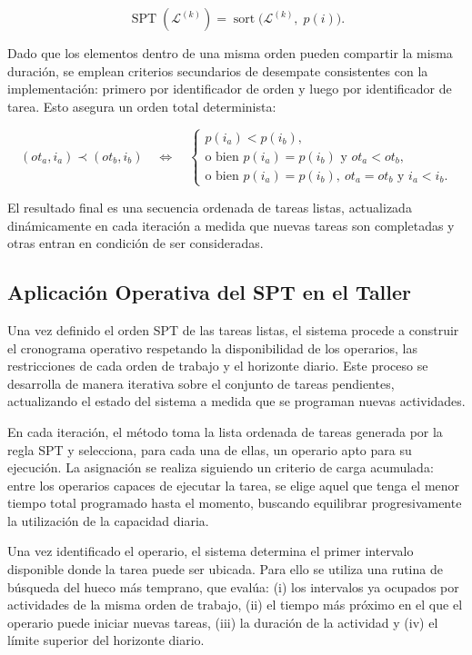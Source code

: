 \[
\operatorname{SPT}(\mathcal{L}^{(k)}) 
= \operatorname{sort}\Big(\mathcal{L}^{(k)},\; p(i)\Big).
\]

Dado que los elementos dentro de una misma orden pueden compartir la misma duración, se 
emplean criterios secundarios de desempate consistentes con la implementación: primero por 
identificador de orden y luego por identificador de tarea. Esto asegura un orden total 
determinista:

\[
(ot_a,i_a) \prec (ot_b,i_b)
\quad\Longleftrightarrow\quad
\begin{cases}
p(i_a) < p(i_b), \\
\text{o bien } p(i_a)=p(i_b) \text{ y } ot_a < ot_b, \\
\text{o bien } p(i_a)=p(i_b),\ ot_a=ot_b \text{ y } i_a < i_b. 
\end{cases}
\]

El resultado final es una secuencia ordenada de tareas listas, actualizada dinámicamente en 
cada iteración a medida que nuevas tareas son completadas y otras entran en condición de 
ser consideradas.

\subsection{Aplicación Operativa del SPT en el Taller}

Una vez definido el orden SPT de las tareas listas, el sistema procede a construir el 
cronograma operativo respetando la disponibilidad de los operarios, las restricciones de 
cada orden de trabajo y el horizonte diario. Este proceso se desarrolla de manera 
iterativa sobre el conjunto de tareas pendientes, actualizando el estado del sistema a 
medida que se programan nuevas actividades.

En cada iteración, el método toma la lista ordenada de tareas generada por la regla SPT y 
selecciona, para cada una de ellas, un operario apto para su ejecución. La asignación se 
realiza siguiendo un criterio de carga acumulada: entre los operarios capaces de ejecutar 
la tarea, se elige aquel que tenga el menor tiempo total programado hasta el momento, 
buscando equilibrar progresivamente la utilización de la capacidad diaria.

Una vez identificado el operario, el sistema determina el primer intervalo disponible donde 
la tarea puede ser ubicada. Para ello se utiliza una rutina de búsqueda del hueco más 
temprano, que evalúa: (i) los intervalos ya ocupados por actividades de la misma orden de 
trabajo, (ii) el tiempo más próximo en el que el operario puede iniciar nuevas tareas, 
(iii) la duración de la actividad y (iv) el límite superior del horizonte diario.

